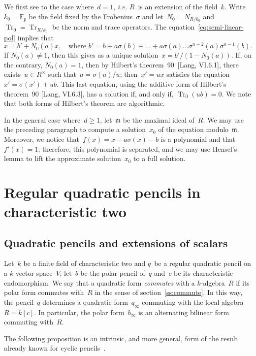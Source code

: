 \documentclass{lms}
\let\fr\mathfrak
\DeclareMathOperator\Tr{Tr}
\def\F{\mathbb{F}}
\begin{document}
We first see to the case where~$d = 1$, \emph{i.e.} $R$~is an extension
of the field~$k$. Write~$k_0 = \F_p$ be the field fixed by the
Frobenius~$σ$ and let~$N_0 = N_{R/k_0}$ and~$\Tr_0 = \Tr_{R/k_0}$ be the
norm and trace operators. The equation~\eqref{eq:semi-linear-pol} implies
that
\begin{equation}
x = b' + N_0(a) x, \quad\text{where $b' = b + a σ(b) + … + a σ(a) …
σ^{n-2}(a) σ^{n-1}(b)$.}
\end{equation}
If $N_0(a) ≠ 1$, then this gives as a unique solution~$x =
b'/(1-N_0(a))$. If, on the contrary, $N_0(a) = 1$, then by
Hilbert's theorem~90~[Lang, VI.6.1], there exists~$u ∈ R^{×}$ such
that~$a = σ(u)/u$; then~$x' = ux$ satisfies the equation~$x' = σ(x') +
ub$. This last equation, using the additive form of Hilbert's theorem~90
[Lang, VI.6.3], has a solution if, and only if, $\Tr_0 (ub) = 0$. We
note that both forms of Hilbert's theorem are algorithmic.

In the general case where~$d ≥ 1$, let~$\fr m$ be the maximal ideal
of~$R$. We may use the preceding paragraph to compute a solution~$x_0$ of
the equation modulo~$\fr m$. Moreover, we notice that~$f(x) = x -  a σ(x)
- b$ is a polynomial and that~$f'(x) = 1$; therefore, this polynomial is
separated, and we may use Hensel's lemma to lift the approximate
solution~$x_0$ to a full solution.

\section{Regular quadratic pencils in characteristic two}
\label{S:quad-reg}
\subsection{Quadratic pencils and extensions of scalars}
Let~$k$ be a finite field of characteristic two and $q$~be a regular
quadratic pencil on a $k$-vector space~$V$;
let~$b$ be the polar pencil of~$q$ and~$c$ be its characteristic endomorphism.
We say that a quadratic form \emph{commutes} with a $k$-algebra~$R$ if
its polar form commutes with~$R$ in the sense of
section~\ref{ss:commute}.
In this way, the pencil~$q$ determines a quadratic form~$q_{∞}$
commuting with the local algebra~$R = k[c]$.
In particular, the polar form~$b_{∞}$ is an alternating bilinear form
commuting with~$R$.

The following proposition is an intrinsic, and more general, form
of the result already known for cyclic pencils~\cite[Prop.~5]{MPG2013}.
\end{document}

